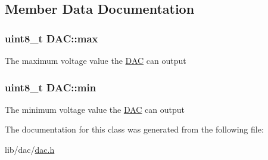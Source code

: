 \subsection{Member Data Documentation}
\subsubsection[{\texorpdfstring{max}{max}}]{\setlength{\rightskip}{0pt plus 5cm}uint8\+\_\+t D\+A\+C\+::max\hspace{0.3cm}{\ttfamily [private]}}\hypertarget{class_d_a_c_a229a81d8ebf43511dfb6815c5cd8f425}{}\label{class_d_a_c_a229a81d8ebf43511dfb6815c5cd8f425}
The maximum voltage value the \hyperlink{class_d_a_c}{D\+AC} can output 
\subsubsection[{\texorpdfstring{min}{min}}]{\setlength{\rightskip}{0pt plus 5cm}uint8\+\_\+t D\+A\+C\+::min\hspace{0.3cm}{\ttfamily [private]}}\hypertarget{class_d_a_c_aa4f21cf166374cfc6edcd412f4d2072b}{}\label{class_d_a_c_aa4f21cf166374cfc6edcd412f4d2072b}
The minimum voltage value the \hyperlink{class_d_a_c}{D\+AC} can output 

The documentation for this class was generated from the following file\+:\begin{DoxyCompactItemize}
\item 
lib/dac/\hyperlink{dac_8h}{dac.\+h}\end{DoxyCompactItemize}
